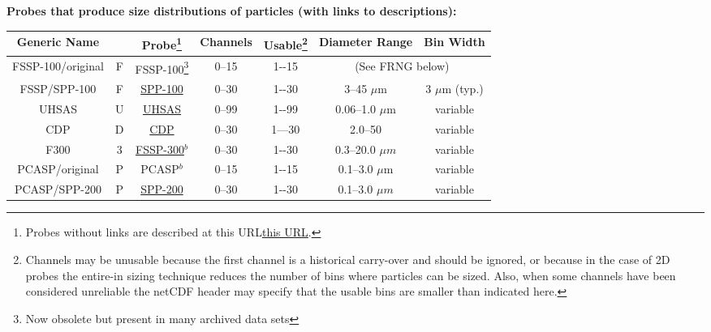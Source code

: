 \begin{center}
\noindent\begin{minipage}[t]{1\columnwidth}%
\begin{center}
\textbf{Probes that produce size distributions of particles (with
links to descriptions):\label{TableOfProbes}}
\par\end{center}
\begin{center}
\begin{tabular}{|c|c|c|c|c|c|c|}
\hline 
\textbf{\small{}Generic Name} &  & \textbf{\small{}Probe}\footnote{Probes without links are described at this URL\href{https://opensky.ucar.edu/islandora/object/archives\%3A8155}{this URL}.} & \textbf{\small{}Channels} & \textbf{\small{}Usable}\footnote{Channels may be unusable because the first channel is a historical
carry-over and should be ignored, or because in the case of 2D probes
the entire-in sizing technique reduces the number of bins where particles
can be sized. Also, when some channels have been considered unreliable
the netCDF header may specify that the usable bins are smaller than
indicated here.} & \textbf{\small{}Diameter Range} & \textbf{\small{}Bin Width}\tabularnewline
\hline 
\hline 
{\small{}FSSP-100/original} & {\small{}F} & {\small{}FSSP-100}\footnote{Now obsolete but present in many archived data sets} & {\small{}0--15} & {\small{}1-{}-15} & \multicolumn{2}{c|}{{\small{}(See FRNG below)}}\tabularnewline
\hline 
FSSP/SPP-100 & F & \href{http://www.eol.ucar.edu/instruments/forward-scattering-spectrometer-probe-model-100}{SPP-100} & 0--30 & 1-{}-30 & \multicolumn{1}{c||}{3--45 $\mu$m } & 3 $\mu$m (typ.)\tabularnewline
\hline 
UHSAS & U & \href{https://www.eol.ucar.edu/instruments/ultra-high-sensitivity-aerosol-spectrometer}{UHSAS} & 0--99 & 1-{}-99 & \multicolumn{1}{c||}{0.06--1.0 $\mu$m} & variable\tabularnewline
\hline 
CDP & D & \href{https://www.eol.ucar.edu/instruments/cloud-droplet-probe}{CDP} & 0--30 & 1---30 & \multicolumn{1}{c||}{2.0--50} & variable\tabularnewline
\hline 
{\small{}F300} & {\small{}3} & {\small{}\href{https://www.eol.ucar.edu/instruments/forward-scattering-spectrometer-probe-model-300}{FSSP-300}$^{b}$} & {\small{}0--30} & {\small{}1-{}-30} & {\small{}0.3--20.0 $\mu m$} & {\small{}variable}\tabularnewline
\hline 
PCASP/original & P & PCASP$^{b}$ & 0--15 & 1-{}-15 & 0.1--3.0 $\mu$m & variable\tabularnewline
\hline 
PCASP/SPP-200 & P & {\small{}\href{https://www.eol.ucar.edu/instruments/signal-processing-package-200-passive-cavity-aerosol-spectrometer-probe}{SPP-200}} & {\small{}0--30} & {\small{}1-{}-30} & {\small{}0.1--3.0 $\mu m$} & {\small{}variable}\tabularnewline

\end{tabular}
\end{center}
\end{minipage}
\end{center}
